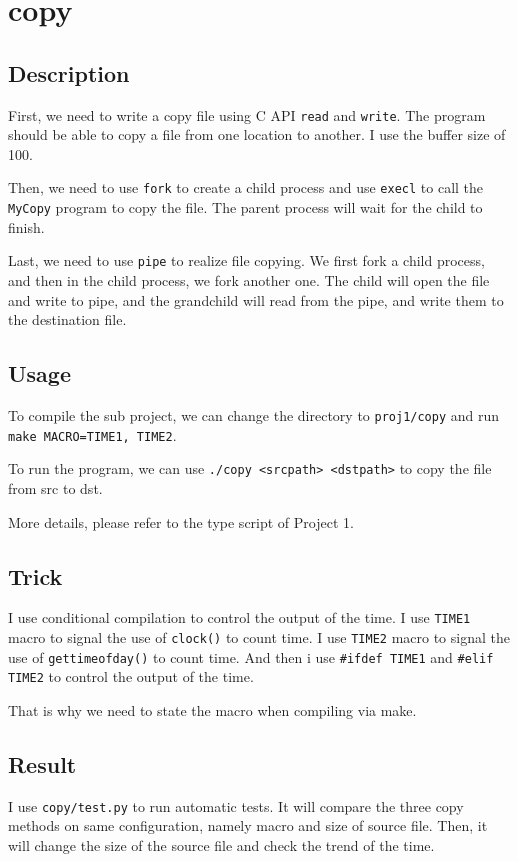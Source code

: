 \section{copy}
\subsection{Description}
First, we need to write a copy file using C API \texttt{read} and \texttt{write}. The program should be able to copy a file from one location to another. 
I use the buffer size of 100.

Then, we need to use \texttt{fork} to create a child process and use \texttt{execl} to call the \texttt{MyCopy} program to copy the file. The parent process will wait for
the child to finish.

Last, we need to use \texttt{pipe} to realize file copying. We first fork a child process,
and then in the child process, we fork another one. The child will open the file and write to 
pipe, and the grandchild will read from the pipe, and write them to the destination file.

\subsection{Usage}
To compile the sub project, we can change the directory to \texttt{proj1/copy} and run \texttt{make MACRO={TIME1, TIME2}}.

To run the program, we can use \texttt{./copy <srcpath> <dstpath>} to copy the file from src to dst.

More details, please refer to the type script of Project 1.

\subsection{Trick}
I use conditional compilation to control the output of the time. 
I use \texttt{TIME1} macro to signal the use of \texttt{clock()} to count time.
I use \texttt{TIME2} macro to signal the use of \texttt{gettimeofday()} to count time.
And then i use \texttt{\#ifdef TIME1} and \texttt{\#elif TIME2} to control the output of the time.

That is why we need to state the macro when compiling via make.

\subsection{Result}
I use \texttt{copy/test.py} to run automatic tests. It will compare the three copy methods
on same configuration, namely macro and size of source file. Then, it will change the size of the source file and 
check the trend of the time.

